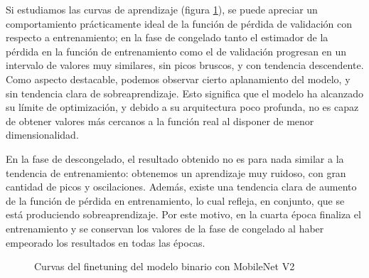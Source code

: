Si estudiamos las curvas de aprendizaje (figura \ref{fig:curvasmbin}), se puede apreciar un comportamiento prácticamente ideal de la función  de pérdida de validación con respecto a entrenamiento; en la fase de congelado tanto el estimador de la pérdida en la función de entrenamiento como el de validación progresan en un intervalo de valores muy similares, sin picos bruscos, y con tendencia descendente. Como aspecto destacable, podemos observar cierto aplanamiento del modelo, y sin tendencia clara de sobreaprendizaje. Esto significa que el modelo ha alcanzado su límite de optimización, y debido a su arquitectura poco profunda, no es capaz de obtener valores más cercanos a la función real al disponer de menor dimensionalidad.

En la fase de descongelado, el resultado obtenido no es para nada similar a la tendencia de entrenamiento: obtenemos un aprendizaje muy ruidoso, con gran cantidad de picos y oscilaciones. Además, existe una tendencia clara de aumento de la función de pérdida en entrenamiento, lo cual refleja, en conjunto, que se está produciendo sobreaprendizaje. Por este motivo, en la cuarta época finaliza el entrenamiento y se conservan los valores de la fase de congelado al haber empeorado los resultados en todas las épocas.

\begin{figure}[H]
	\centering
	\caption{Curvas del finetuning del modelo binario con MobileNet V2}
	\label{fig:curvasmbin}
\end{figure}

